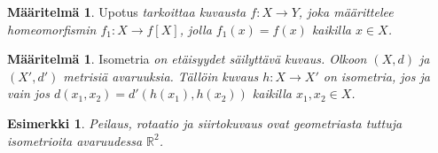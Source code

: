\documentclass[12pt,a4paper,leqno]{report}
\newcommand{\R}{\mathbb{R}}
\theoremstyle{plain}
\newtheorem{lem}[equation]{Lemma}
\theoremstyle{definition}
\newtheorem{maar}[equation]{Määritelmä}
\newtheorem{esim}[equation]{Esimerkki}
\theoremstyle{remark}
\begin{document}
\begin{maar}Upotus \emph{tarkoittaa kuvausta $f\colon X\rightarrow Y$, joka määrittelee homeomorfismin $f_1\colon X\rightarrow f[X]$, jolla $f_1(x)=f(x)$ kaikilla $x\in X$. %
}
\end{maar}
\begin{maar}Isometria \emph{on etäisyydet säilyttävä kuvaus. Olkoon $(X,d)$ ja $(X',d')$ metrisiä avaruuksia. %
Tällöin kuvaus $h\colon X\rightarrow X'$ on isometria, jos ja vain jos $d(x_1,x_2)=d'(h(x_1),h(x_2))$ kaikilla $x_1,x_2 \in X$.
}
\end{maar}
%
\begin{esim}\emph{
Peilaus, rotaatio ja siirtokuvaus ovat geometriasta tuttuja isometrioita avaruudessa $\R^2$.}
\end{esim}
\end{document}
